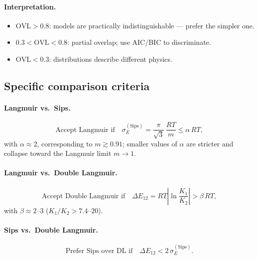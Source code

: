 \documentclass[journal=jacsat,manuscript=article]{achemso}
\begin{document}
\paragraph{Interpretation.}
\begin{itemize}
	\item $\mathrm{OVL} > 0.8$: models are practically
	indistinguishable --- prefer the simpler one.
	\item $0.3 < \mathrm{OVL} < 0.8$: partial overlap; use AIC/BIC
	to discriminate.
	\item $\mathrm{OVL} < 0.3$: distributions describe different
	physics.
\end{itemize}

\subsection{Specific comparison criteria}
\label{sec:si_comparison_criteria}

\paragraph{Langmuir vs.\ Sips.}
\begin{equation}
	\boxed{
		\text{Accept Langmuir if}\quad
		\sigma_E^{\mathrm{(Sips)}}
		= \frac{\pi}{\sqrt{3}}\,\frac{RT}{m} \leq \alpha\,RT,
	}
	\label{eq:si_criterion_LvsS}
\end{equation}
with $\alpha \approx 2$, corresponding to $m \gtrsim 0.91$; smaller
values of $\alpha$ are stricter and collapse toward the Langmuir limit
$m \to 1$.

\paragraph{Langmuir vs.\ Double Langmuir.}
\begin{equation}
	\boxed{
		\text{Accept Double Langmuir if}\quad
		\Delta E_{12} = RT\left|\ln\frac{K_1}{K_2}\right| > \beta\,RT,
	}
	\label{eq:si_criterion_LvsDL}
\end{equation}
with $\beta \approx 2$--$3$ ($K_1/K_2 > 7.4$--$20$).

\paragraph{Sips vs.\ Double Langmuir.}
\begin{equation}
	\boxed{
		\text{Prefer Sips over DL if}\quad
		\Delta E_{12} < 2\,\sigma_E^{\mathrm{(Sips)}}.
	}
	\label{eq:si_criterion_SvsDL}
\end{equation}
\end{document}
